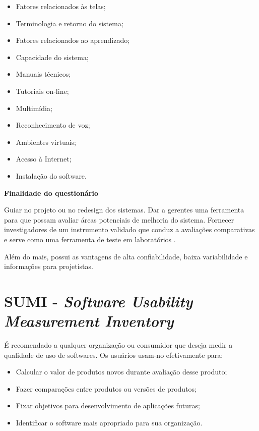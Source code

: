 		\begin{itemize}
			\item{Fatores relacionados às telas;}
			\item{Terminologia e retorno do sistema;}
			\item{Fatores relacionados ao aprendizado;}
			\item{Capacidade do sistema;}
			\item{Manuais técnicos;}
			\item{Tutoriais on-line;}
			\item{Multimídia;}
			\item{Reconhecimento de voz;}
			\item{Ambientes virtuais;}
			\item{Acesso à Internet;}
			\item{Instalação do software.}
		\end{itemize}

		\textbf{Finalidade do questionário}

		Guiar no projeto ou no redesign dos sistemas. 
		Dar a gerentes uma ferramenta para que possam avaliar áreas potenciais de melhoria do sistema. 
		Fornecer investigadores de um instrumento validado que conduz a avaliações comparativas e serve como uma ferramenta de teste em laboratórios .

		Além do mais, possui as vantagens de alta confiabilidade, baixa variabilidade e informações para projetistas. 

	\section[SUMI]{SUMI - \emph{Software Usability Measurement Inventory}}
	\label{sec:questionarios_SUMI}

		É recomendado a qualquer organização ou consumidor que deseja medir a qualidade de uso de softwares. Os usuários usam-no efetivamente para: 

		\begin{itemize}
			\item{Calcular o valor de produtos novos durante avaliação desse produto;}
			\item{Fazer comparações entre produtos ou versões de produtos;}
			\item{Fixar objetivos para desenvolvimento de aplicações futuras;}
			\item{Identificar o software mais apropriado para sua organização.}
		\end{itemize}

